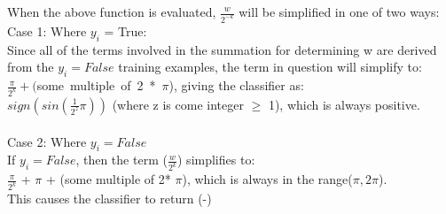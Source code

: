 \documentclass[11pt, oneside]{article}   	%
\begin{document}
When the above function is evaluated, $\frac{w}{2^{-k}}$ will be simplified in one of two ways:\\
\indent Case 1:  Where $y_i$ = True:\\
\indent\indent Since all of the terms involved in the summation for determining w are derived from \indent\indent the $y_i=False$ training examples, the term in question will simplify to:\\
\indent\indent\indent  $\frac{\pi}{2^k} + ($some\ multiple\ of\ 2\ *\ $\pi$), giving the classifier as:\\
\indent\indent $sign(sin(\frac{1}{2^z}\pi))$ (where z is come integer $\geq$ 1), which is always positive.\\\\
\indent Case 2: Where $y_i = False$\\
\indent\indent If $y_i = False$, then the term ($\frac{w}{2^k}$) simplifies to:\\
\indent\indent\indent $\frac{\pi}{2^k}$ + $\pi$ + (some multiple of 2* $\pi$), which is always in the range($\pi,2\pi$).\\
\indent\indent This causes the classifier to return (-)\\
\end{document}
